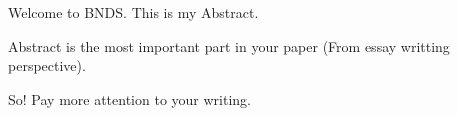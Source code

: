 
Welcome to BNDS. This is my Abstract. 


Abstract is the most important part in your paper (From essay writting perspective).

So! Pay more attention to your writing. 